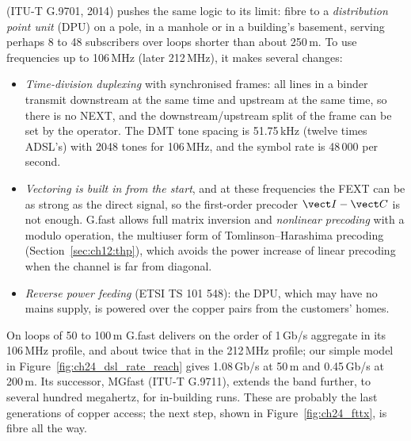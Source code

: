  (ITU-T G.9701, 2014) pushes the same logic to its limit: fibre to a \emph{distribution
point unit} (DPU) on a pole, in a manhole or in a building's basement, serving perhaps 8 to 48
subscribers over loops shorter than about 250\,m. To use frequencies up to 106\,MHz (later
212\,MHz), it makes several changes:
\begin{itemize}
\item \emph{Time-division duplexing} with synchronised frames: all lines in a binder transmit
downstream at the same time and upstream at the same time, so there is no NEXT, and the
downstream/upstream split of the frame can be set by the operator. The DMT tone spacing is
51.75\,kHz (twelve times ADSL's) with 2048 tones for 106\,MHz, and the symbol rate is 48\,000 per second.
\item \emph{Vectoring is built in from the start}, and at these frequencies the FEXT can be as strong as
the direct signal, so the first-order precoder $\vect I-\vect C$ is not enough. G.fast allows full
matrix inversion and \emph{nonlinear precoding} with a modulo operation, the multiuser form of
Tomlinson--Harashima precoding (Section~\ref{sec:ch12:thp}), which avoids the power increase of linear
precoding when the channel is far from diagonal.
\item \emph{Reverse power feeding} (ETSI TS 101 548): the DPU, which may have no mains supply, is
powered over the copper pairs from the customers' homes.
\end{itemize}


On loops of 50 to 100\,m G.fast delivers on the order of 1\,Gb/s aggregate in its 106\,MHz profile,
and about twice that in the 212\,MHz profile; our simple model in Figure~\ref{fig:ch24_dsl_rate_reach}
gives 1.08\,Gb/s at 50\,m and 0.45\,Gb/s at 200\,m. Its successor, MGfast (ITU-T G.9711), extends the
band further, to several hundred megahertz, for in-building runs. These are probably the last
generations of copper access; the next step, shown in Figure~\ref{fig:ch24_fttx}, is fibre all the way.

